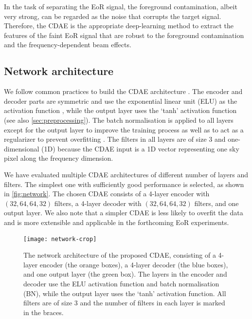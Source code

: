 \documentclass[letters,a4paper,fleqn,usenatbib]{mnras}
\begin{document}
In the task of separating the EoR signal, the foreground contamination,
albeit very strong, can be regarded as the noise that corrupts the
target signal.
Therefore, the CDAE is the appropriate deep-learning method to extract
the features of the faint EoR signal that are robust to the foreground
contamination and the frequency-dependent beam effects.


\subsection{Network architecture}
\label{sec:architecture}

We follow common practices to build the CDAE architecture
\citep[e.g.,][]{suganuma2018,geron2017}.
The encoder and decoder parts are symmetric and use the exponential
linear unit (ELU) as the activation function \citep{clevert2016},
while the output layer uses the `tanh' activation function (see also
\autoref{sec:preprocessing}).
The batch normalisation is applied to all layers except for the output
layer to improve the training process as well as to act as a regularizer
to prevent overfitting \citep{ioffe2015}.
The filters in all layers are of size 3 and one-dimensional (1D) because
the CDAE input is a 1D vector representing one sky pixel along the
frequency dimension.

We have evaluated multiple CDAE architectures of different number of
layers and filters.
The simplest one with sufficiently good performance is selected, as
shown in \autoref{fig:network}.
The chosen CDAE consists of a 4-layer encoder with $(32,64,64,32)$
filters, a 4-layer decoder with $(32,64,64,32)$ filters, and one output
layer.
We also note that a simpler CDAE is less likely to overfit the data and
is more extensible and applicable in the forthcoming EoR experiments.

\begin{figure}
  \centering
  \texttt{[image: network-crop]}
  \caption{\label{fig:network}%
    The network architecture of the proposed CDAE, consisting of a
    4-layer encoder (the orange boxes), a 4-layer decoder (the blue
    boxes), and one output layer (the green box).
    The layers in the encoder and decoder use the ELU activation
    function and batch normalisation (BN), while the output layer uses
    the `tanh' activation function.
    All filters are of size 3 and the number of filters in each layer
    is marked in the braces.
  }
\end{figure}
\end{document}
